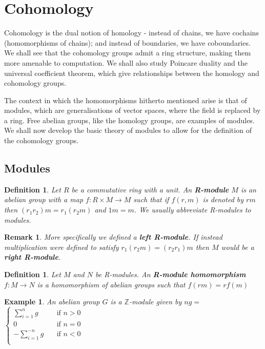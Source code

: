 \documentclass{article}
\newtheorem{definition}[theorem]{Definition}
\newtheorem{example}[theorem]{Example}
\newtheorem{remark}[theorem]{Remark}
\begin{document}
\section{Cohomology}
Cohomology is the dual notion of homology - instead of chains, we have cochains (homomorphisms of chains); and instead of boundaries, we have coboundaries. We shall see that the cohomology groups admit a ring structure, making them more amenable to computation. We shall also study Poincare duality and the universal coefficient theorem, which give relationships between the homology and cohomology groups.

The context in which the homomorphisms hitherto mentioned arise is that of modules, which are generalisations of vector spaces, where the field is replaced by a ring. Free abelian groups, like the homology groups, are examples of modules. We shall now develop the basic theory of modules to allow for the definition of the cohomology groups.
\subsection{Modules}
\begin{definition}
Let $R$ be a commutative ring with a unit. An \textbf{R-module} $M$ is an abelian group with a map $f\colon R\times M\to M$ such that if $f(r,m)$ is denoted by $rm$ then $(r_1r_2)m=r_1(r_2m)$ and $1m=m$. We usually abbreviate R-modules to modules.
\end{definition}
\begin{remark}
More specifically we defined a \textbf{left R-module}. If instead multiplication were defined to satisfy $r_1(r_2m)=(r_2r_1)m$ then $M$ would be a \textbf{right R-module}.
\end{remark}

\begin{definition}
Let $M$ and $N$ be R-modules. An \textbf{R-module homomorphism} $f\colon M\to N$ is a homomorphism of abelian groups such that $f(rm)=rf(m)$ 
\end{definition}

\begin{example}
An abelian group $G$ is a $\mathbb{Z}$-module given by $ng=$$\begin{cases}
       \sum_{i=1}^ng &\quad\text{if }n>0 \\
       0 &\quad\text{if }n=0 \\
       -\sum_{i=1}^{-n}g &\quad\text{if }n<0 \\
     \end{cases}$\\
\end{example}
\end{document}
